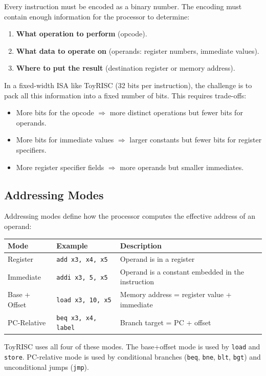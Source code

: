\documentclass[12pt,a4paper]{article}
\begin{document}
Every instruction must be encoded as a binary number. The encoding must contain enough information for the processor to determine:

\begin{enumerate}
    \item \textbf{What operation to perform} (opcode).
    \item \textbf{What data to operate on} (operands: register numbers, immediate values).
    \item \textbf{Where to put the result} (destination register or memory address).
\end{enumerate}

In a fixed-width ISA like ToyRISC (32 bits per instruction), the challenge is to pack all this information into a fixed number of bits. This requires trade-offs:
\begin{itemize}
    \item More bits for the opcode $\Rightarrow$ more distinct operations but fewer bits for operands.
    \item More bits for immediate values $\Rightarrow$ larger constants but fewer bits for register specifiers.
    \item More register specifier fields $\Rightarrow$ more operands but smaller immediates.
\end{itemize}

\subsection{Addressing Modes}

Addressing modes define how the processor computes the effective address of an operand:

\begin{longtable}{p{4cm}p{4cm}p{5cm}}
\toprule
\textbf{Mode} & \textbf{Example} & \textbf{Description} \\
\midrule
Register & \texttt{add x3, x4, x5} & Operand is in a register \\
Immediate & \texttt{addi x3, 5, x5} & Operand is a constant embedded in the instruction \\
Base + Offset & \texttt{load x3, 10, x5} & Memory address = register value + immediate \\
PC-Relative & \texttt{beq x3, x4, label} & Branch target = PC + offset \\
\bottomrule
\end{longtable}

ToyRISC uses all four of these modes. The base+offset mode is used by \texttt{load} and \texttt{store}. PC-relative mode is used by conditional branches (\texttt{beq}, \texttt{bne}, \texttt{blt}, \texttt{bgt}) and unconditional jumps (\texttt{jmp}).
\end{document}
